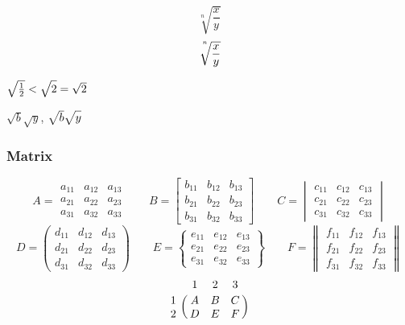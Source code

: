 \[
    \sqrt[n]{\frac{x}{y}}
\]
\[
    \sqrt[\uproot{16}\leftroot{-2}n]{\frac{x}{y}}   %
\]

$ \sqrt{\frac{1}{2}} < \sqrt{ \vphantom{\frac{1}{2}} 2} = \sqrt{2} $

$ \sqrt{b} \sqrt{y} $, $ \sqrt{\mathstrut b} \sqrt{\mathstrut y} $

\subsubsection{Matrix}
\[
    A = \begin{matrix}
            a_{11} & a_{12} & a_{13} \\
            a_{21} & a_{22} & a_{23} \\
            a_{31} & a_{32} & a_{33}
        \end{matrix} \qquad
    B = \begin{bmatrix}
            b_{11} & b_{12} & b_{13} \\
            b_{21} & b_{22} & b_{23} \\
            b_{31} & b_{32} & b_{33}
        \end{bmatrix} \qquad
    C = \begin{vmatrix}
            c_{11} & c_{12} & c_{13} \\
            c_{21} & c_{22} & c_{23} \\
            c_{31} & c_{32} & c_{33}
        \end{vmatrix}
\]
\[
    D = \begin{pmatrix}
            d_{11} & d_{12} & d_{13} \\
            d_{21} & d_{22} & d_{23} \\
            d_{31} & d_{32} & d_{33}
        \end{pmatrix} \qquad
    E = \begin{Bmatrix}
            e_{11} & e_{12} & e_{13} \\
            e_{21} & e_{22} & e_{23} \\
            e_{31} & e_{32} & e_{33}
        \end{Bmatrix} \qquad
    F = \begin{Vmatrix}
            f_{11} & f_{12} & f_{13} \\
            f_{21} & f_{22} & f_{23} \\
            f_{31} & f_{32} & f_{33}
        \end{Vmatrix}
\]
\[
    \bordermatrix{
          & 1 & 2 & 3 \cr
        1 & A & B & C \cr
        2 & D & E & F \cr
    }
\]

